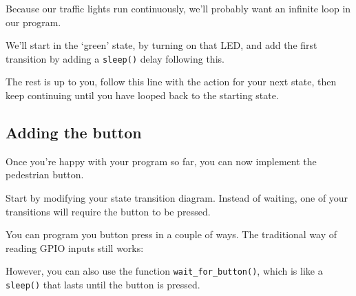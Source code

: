 		
		
		Because our traffic lights run continuously, we'll probably want an infinite loop in our program.
		
		
		
		We'll start in the `green' state, by turning on that LED, and add the first transition by adding a \texttt{sleep()} delay following this.
		
		
		
		The rest is up to you, follow this line with the action for your next state, then keep continuing until you have looped back to the starting state.
		
	\subsection*{Adding the button}
	
		Once you're happy with your program so far, you can now implement the pedestrian button.
		
		Start by modifying your state transition diagram. Instead of waiting, one of your transitions will require the button to be pressed.
		
		You can program you button press in a couple of ways. The traditional way of reading GPIO inputs still works:
		
		
		
		However, you can also use the function \texttt{wait\_for\_button()}, which is like a \texttt{sleep()} that lasts until the button is pressed.
		
		